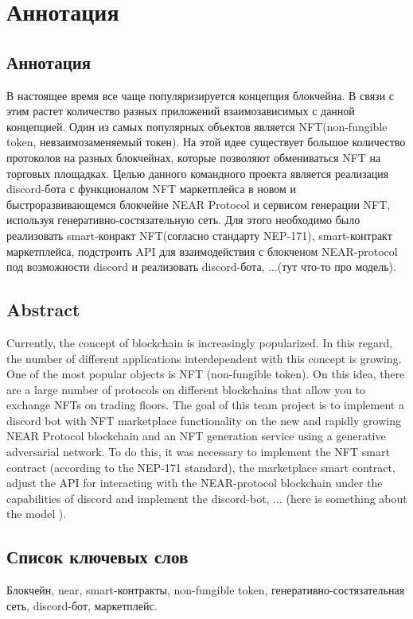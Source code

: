 \section{Аннотация}

\subsection{Аннотация}

В настоящее время все чаще популяризируется концепция блокчейна. В связи с этим растет количество разных приложений взаимозависимых с данной концепцией. Один из самых популярных объектов является NFT(non-fungible token, невзаимозаменяемый токен). На этой идее существует большое количество протоколов на разных блокчейнах, которые позволяют обмениваться NFT на торговых площадках. Целью данного командного проекта является реализация discord-бота с функционалом NFT маркетплейса в новом и быстроразвивающемся блокчейне NEAR Protocol и сервисом генерации NFT, используя генеративно-состязательную сеть. Для этого необходимо было реализовать smart-конракт NFT(согласно стандарту NEP-171), smart-контракт маркетплейса, подстроить API для взаимодействия с блокченом NEAR-protocol под возможности discord и реализовать discord-бота, ...(тут что-то про модель).

\subsection{Abstract}
Currently, the concept of blockchain is increasingly popularized. In this regard, the number of different applications interdependent with this concept is growing. One of the most popular objects is NFT (non-fungible token). On this idea, there are a large number of protocols on different blockchains that allow you to exchange NFTs on trading floors. The goal of this team project is to implement a discord bot with NFT marketplace functionality on the new and rapidly growing NEAR Protocol blockchain and an NFT generation service using a generative adversarial network. To do this, it was necessary to implement the NFT smart contract (according to the NEP-171 standard), the marketplace smart contract, adjust the API for interacting with the NEAR-protocol blockchain under the capabilities of discord and implement the discord-bot, ... (here is something about the model ).

\subsection{Список ключевых слов}
Блокчейн, near, smart-контракты, non-fungible token, генеративно-состязательная сеть, discord-бот, маркетплейс.

\newpage
